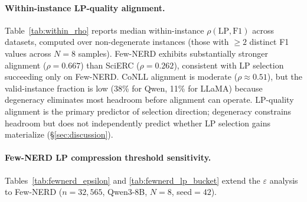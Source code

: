 \paragraph{Within-instance LP-quality alignment.}\label{app:within_instance_rho}

Table~\ref{tab:within_rho} reports median within-instance $\rho(\text{LP}, \text{F1})$ across datasets, computed over non-degenerate instances (those with ${\geq}2$ distinct F1 values across $N{=}8$ samples).
Few-NERD exhibits substantially stronger alignment ($\rho{=}0.667$) than SciERC ($\rho{=}0.262$), consistent with LP selection succeeding only on Few-NERD.
CoNLL alignment is moderate ($\rho{\approx}0.51$), but the valid-instance fraction is low (38\% for Qwen, 11\% for LLaMA) because degeneracy eliminates most headroom before alignment can operate.
LP-quality alignment is the primary predictor of selection direction; degeneracy constrains headroom but does not independently predict whether LP selection gains materialize (\S\ref{sec:discussion}).

\begin{table}[h]
\centering
\small
\caption{Within-instance LP-quality alignment across datasets ($N{=}8$, $T{=}1.0$). $\rho$: median Spearman correlation between LP and F1 within each instance, over non-degenerate instances ($n_{\text{valid}}$: ${\geq}2$ distinct F1 values). Counts are from the primary seed (seed 42); text references use 3-seed mean degeneracy rates.}
\label{tab:within_rho}
\end{table}

\clearpage
\paragraph{Few-NERD LP compression threshold sensitivity.}\label{app:fewnerd_epsilon}

Tables~\ref{tab:fewnerd_epsilon} and \ref{tab:fewnerd_lp_bucket} extend the $\varepsilon$ analysis to Few-NERD ($n{=}32{,}565$, Qwen3-8B, $N{=}8$, seed${=}42$).

